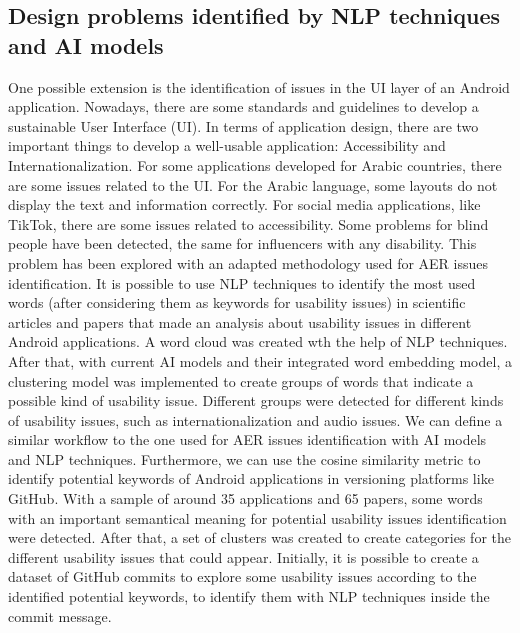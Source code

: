 \subsection{Design problems identified by NLP techniques and AI models}
 One possible extension is the identification of issues in the UI layer of an Android application. Nowadays, there are some standards and guidelines to develop a sustainable User Interface (UI). In terms of application design, there are two important things to develop a well-usable application: Accessibility and Internationalization. For some applications developed for Arabic countries, there are some issues related to the UI. For the Arabic language, some layouts do not display the text and information correctly. For social media applications, like TikTok, there are some issues related to accessibility. Some problems for blind people have been detected, the same for influencers with any disability. 
 This problem has been explored with an adapted methodology used for AER issues identification. It is possible to use NLP techniques to identify the most used words (after considering them as keywords for usability issues) in scientific articles and papers that made an analysis about usability issues in different Android applications. A word cloud was created wth the help of NLP techniques. After that, with current AI models and their integrated word embedding model, a clustering model was implemented to create groups of words that indicate a possible kind of usability issue. Different groups were detected for different kinds of usability issues, such as internationalization and audio issues. We can define a similar workflow to the one used for AER issues identification with AI models and NLP techniques. Furthermore, we can use the cosine similarity metric to identify potential keywords of Android applications in versioning platforms like GitHub.
 With a sample of around 35 applications and 65 papers, some words with an important semantical meaning for potential usability issues identification were detected. After that, a set of clusters was created to create categories for the different usability issues that could appear. Initially, it is possible to create a dataset of GitHub commits to explore some usability issues according to the identified potential keywords, to identify them with NLP techniques inside the commit message.